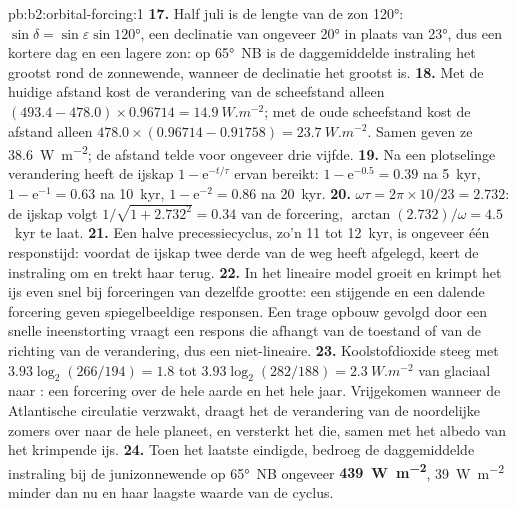 \begin{solution}{pb:b2:orbital-forcing:1}
\textbf{17.} Half juli is de lengte van de zon \ang{120}: $\sin\delta = \sin\varepsilon\sin\ang{120}$,
een declinatie van ongeveer \ang{20} in plaats van \ang{23}, dus een kortere dag en een lagere zon: op
\ang{65}~NB is de daggemiddelde instraling het grootst rond de zonnewende, wanneer de declinatie het grootst is.
\textbf{18.} Met de huidige afstand kost de verandering van de scheefstand alleen $(493.4 - 478.0) \times
0.96714 = \qty{14.9}{W.m^{-2}}$; met de oude scheefstand kost de afstand alleen $478.0 \times
(0.96714 - 0.91758) = \qty{23.7}{W.m^{-2}}$. Samen geven ze \qty{38.6}{W.m^{-2}}; de afstand
telde voor ongeveer drie vijfde.
\textbf{19.} Na een plotselinge verandering heeft de ijskap $1 - \mathrm e^{-t/\tau}$ ervan bereikt:
$1 - \mathrm e^{-0.5} = 0.39$ na \qty{5}{kyr}, $1 - \mathrm e^{-1} = 0.63$ na \qty{10}{kyr},
$1 - \mathrm e^{-2} = 0.86$ na \qty{20}{kyr}.
\textbf{20.} $\omega\tau = 2\pi \times 10/23 = 2.732$: de ijskap volgt $1/\sqrt{1 + 2.732^2} =
0.34$ van de forcering, $\arctan(2.732)/\omega = 4.5$~kyr te laat.
\textbf{21.} Een halve precessiecyclus, zo'n 11 tot \qty{12}{kyr}, is ongeveer één responstijd: voordat
de ijskap twee derde van de weg heeft afgelegd, keert de instraling om en trekt haar terug.
\textbf{22.} In het lineaire model groeit en krimpt het ijs even snel bij forceringen van dezelfde
grootte: een stijgende en een dalende forcering geven spiegelbeeldige responsen. Een trage opbouw gevolgd door een snelle
ineenstorting vraagt een respons die afhangt van de toestand of van de richting van de verandering, dus een
niet-lineaire.
\textbf{23.} Koolstofdioxide steeg met $3.93\log_2(266/194) = 1.8$ tot $3.93\log_2(282/188) =
\qty{2.3}{W.m^{-2}}$ van glaciaal naar : een forcering over de hele aarde en het hele
jaar. Vrijgekomen wanneer de Atlantische circulatie verzwakt, draagt het de verandering van de noordelijke
zomers over naar de hele planeet, en versterkt het die, samen met het albedo van het krimpende ijs.
\textbf{24.} Toen het laatste  eindigde, bedroeg de daggemiddelde instraling bij de junizonnewende op
\ang{65}~NB ongeveer \textbf{\qty{439}{W.m^{-2}}}, \qty{39}{W.m^{-2}} minder dan nu en haar laagste
waarde van de cyclus.
\end{solution}
